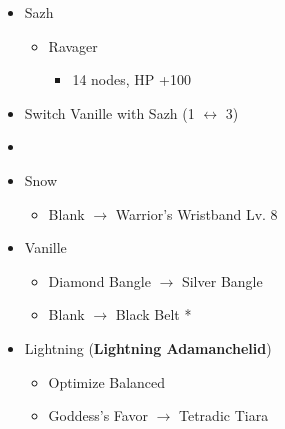 \begin{multicols}{2}
\begin{menu}
\begin{itemize}
\begin{itemize}
\begin{itemize}
\begin{itemize}
                      \item 5 nodes down 2, Accessory
                    \end{itemize}
            \end{itemize}
      \item Sazh
            \begin{itemize}
              \item Ravager
                    \begin{itemize}
                      \item 14 nodes,  HP +100
                    \end{itemize}
            \end{itemize}
    \end{itemize}
    \paradigm
    \begin{itemize}
      \item Switch Vanille with Sazh (1 $\leftrightarrow$ 3)
      \item {}%
            {\paradigmline{\com}{(\com)}{(\com)}}%
            {\paradigmline[2]{\textit{\com}}{\textit{(\com)}}{\textit{(\com)}}}%
            {\paradigmline{\syn}{\sen}{(\sab)}}%
            {\paradigmline{[\syn]}{\rav}{(\med)}}%
            {\paradigmline{\rav}{\rav}{[\med]}}%
            {\paradigmline{\rav}{\rav}{[\rav]}}
    \end{itemize}
    \equip
    \begin{itemize}
      \item Snow
            \begin{itemize}
              \item Blank $\rightarrow$ Warrior's Wristband Lv. 8
            \end{itemize}
      \item Vanille
            \begin{itemize}
              \item Diamond Bangle $\rightarrow$ Silver Bangle
              \item Blank $\rightarrow$ Black Belt *
            \end{itemize}
      \item Lightning ({\bf Lightning Adamanchelid})
            \begin{itemize}
              \item Optimize Balanced
              \item Goddess's Favor $\rightarrow$ Tetradic Tiara
            \end{itemize}
    \end{itemize}
  \end{itemize}
\end{menu}


\end{multicols}
